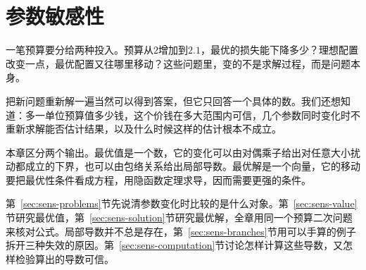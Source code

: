 \chapter{参数敏感性}
\label{chap:parametric-sensitivity}

一笔预算要分给两种投入。预算从$2$增加到$2.1$，最优的损失能下降多少？理想配置改变一点，最优配置又往哪里移动？这些问题里，变的不是求解过程，而是问题本身。

把新问题重新解一遍当然可以得到答案，但它只回答一个具体的数。我们还想知道：多一单位预算值多少钱，这个价钱在多大范围内可信，几个参数同时变化时不重新求解能否估计结果，以及什么时候这样的估计根本不成立。

本章区分两个输出。最优值是一个数，它的变化可以由对偶乘子给出对任意大小扰动都成立的下界，也可以由包络关系给出局部导数。最优解是一个向量，它的移动要把最优性条件看成方程，用隐函数定理求导，因而需要更强的条件。

第~\ref{sec:sens-problems}节先说清参数变化时比较的是什么对象。第~\ref{sec:sens-value}节研究最优值，第~\ref{sec:sens-solution}节研究最优解，全章用同一个预算二次问题来核对公式。局部导数并不总是存在，第~\ref{sec:sens-branches}节用可以手算的例子拆开三种失效的原因。第~\ref{sec:sens-computation}节讨论怎样计算这些导数，又怎样检验算出的导数可信。







